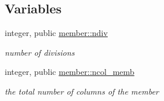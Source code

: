 \subsection*{Variables}
\begin{DoxyCompactItemize}
\item 
integer, public \hyperlink{namespacemember_a3e6a3b0896edb5c30c113dc22ab7181a}{member\+::ndiv}
\begin{DoxyCompactList}\small\item\em number of divisions \end{DoxyCompactList}\item 
integer, public \hyperlink{namespacemember_a20895477b227a3352a4e758b21b01bf8}{member\+::ncol\+\_\+memb}
\begin{DoxyCompactList}\small\item\em the total number of columns of the member \end{DoxyCompactList}\end{DoxyCompactItemize}

